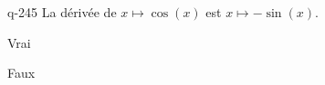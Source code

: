 \begin{truefalse}{q-245}
La dérivée de $x\mapsto \cos(x)$ est $x\mapsto -\sin(x)$.
\item* Vrai
\item Faux
\end{truefalse}

